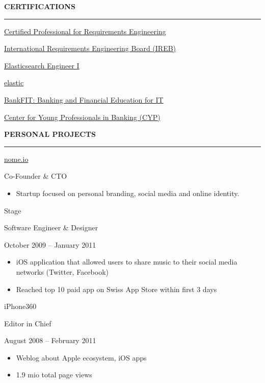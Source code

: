 \documentclass[11pt, a4paper, ragged2e, withhyper]{altacv}
\renewcommand{\cvsectionfont}{\Large\sffamily\bfseries}
\newcommand{\cveventbreak}[4]{%
  {\Large\color{emphasis}#1\par}
  \medskip\normalsize
  \ifstrequal{#2}{}{}{
  	{#2}}\par
  \ifstrequal{#3}{}{}{{
  	{#3}}}\par
  \ifstrequal{#4}{}{}{{
  	{#4}}}\par
  \medskip\normalsize
}
\renewcommand{\cvsection}[2][]{%
  \bigskip%
  \ifstrequal{#1}{}{}{\marginpar{\vspace*{\dimexpr1pt-\baselineskip}\raggedright}}%
  {\color{heading}\cvsectionfont\MakeUppercase{#2}}\\%
  {\color{headingrule}\rule{\linewidth}{0.5pt}\par}\bigskip
}
\begin{document}
\begin{paracol}{2}
	\newpage
	
	\cvsection{Certifications}
	\cveventbreak{\href{https://www.ireb.org/en/cpre/foundation/}{Certified Professional for Requirements Engineering}}{\href{https://www.ireb.org/en}{International Requirements Engineering Board (IREB)}}{}{}

	\bigskip
	\cveventbreak{\href{https://www.elastic.co/training/elasticsearch-engineer-1}{Elasticsearch Engineer I}}{\href{https://elastic.co}{elastic}}{}{}

	\bigskip
	\cveventbreak{\href{https://cyp.ch/smart-education/bankfit}{BankFIT: Banking and Financial Education for IT}}{\href{https://cyp.ch}{Center for Young Professionals in Banking (CYP)}}{}{}

	\cvsection{Personal Projects}
	
	\cveventbreak{\href{https://www.nome.io}{nome.io}}{Co-Founder \& CTO}{}{}
	\begin{itemize}[label=\color{bullet}\textbullet]
		\item Startup focused on personal branding, social media and online identity.
	\end{itemize}
	
	\bigskip
	
	\cveventbreak{Stage}{Software Engineer \& Designer}{October 2009 -- January 2011}{}
	\begin{itemize}[label=\color{bullet}\textbullet]
		\item iOS application that allowed users to share music to their social media networks (Twitter, Facebook)
		\item Reached top 10 paid app on Swiss App Store within first 3 days
	\end{itemize}

	\bigskip
	
	\cveventbreak{iPhone360}{Editor in Chief}{August 2008 -- February 2011}{}
	\begin{itemize}[label=\color{bullet}\textbullet]
		\item Weblog about Apple ecosystem, iOS apps
		\item 1.9 mio total page views
	\end{itemize}


\end{paracol}
\end{document}
